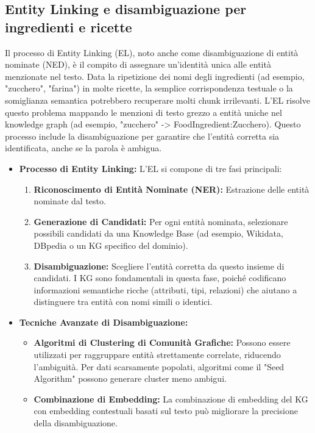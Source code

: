\documentclass[a4paper, 11pt]{article}
\begin{document}
\subsection{Entity Linking e disambiguazione per ingredienti e ricette}
Il processo di Entity Linking (EL), noto anche come disambiguazione di entità nominate (NED), è il compito di assegnare un'identità unica alle entità menzionate nel testo. \cite{entity_linking_wiki} Data la ripetizione dei nomi degli ingredienti (ad esempio, "zucchero", "farina") in molte ricette, la semplice corrispondenza testuale o la somiglianza semantica potrebbero recuperare molti chunk irrilevanti. L'EL risolve questo problema mappando le menzioni di testo grezzo a entità uniche nel knowledge graph (ad esempio, "zucchero" -> FoodIngredient:Zucchero). Questo processo include la disambiguazione \cite{entity_linking_wiki} per garantire che l'entità corretta sia identificata, anche se la parola è ambigua.
\begin{itemize}
    \item \textbf{Processo di Entity Linking:} L'EL si compone di tre fasi principali:
    \begin{enumerate}
        \item \textbf{Riconoscimento di Entità Nominate (NER):} Estrazione delle entità nominate dal testo. \cite{entity_linking_wiki}
        \item \textbf{Generazione di Candidati:} Per ogni entità nominata, selezionare possibili candidati da una Knowledge Base (ad esempio, Wikidata, DBpedia o un KG specifico del dominio). \cite{entity_linking_wiki}
        \item \textbf{Disambiguazione:} Scegliere l'entità corretta da questo insieme di candidati. \cite{entity_linking_wiki} I KG sono fondamentali in questa fase, poiché codificano informazioni semantiche ricche (attributi, tipi, relazioni) che aiutano a distinguere tra entità con nomi simili o identici. \cite{understanding_kg}
    \end{enumerate}
    \item \textbf{Tecniche Avanzate di Disambiguazione:}
    \begin{itemize}
        \item \textbf{Algoritmi di Clustering di Comunità Grafiche:} Possono essere utilizzati per raggruppare entità strettamente correlate, riducendo l'ambiguità. \cite{kg_entity_disambiguation} Per dati scarsamente popolati, algoritmi come il "Seed Algorithm" possono generare cluster meno ambigui. \cite{kg_entity_disambiguation}
        \item \textbf{Combinazione di Embedding:} La combinazione di embedding del KG con embedding contestuali basati sul testo può migliorare la precisione della disambiguazione. \cite{ned_with_kg_harvard}
    \end{itemize}
\end{itemize}
\end{document}
